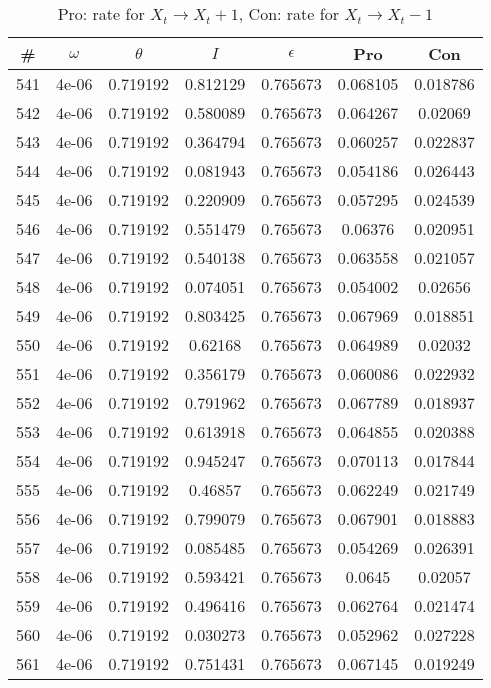 \newpage
\begin{table}
\caption{Pro: rate for $X_t \rightarrow X_t + 1$, Con: rate for $X_t \rightarrow X_t - 1$}
\begin{tabular*}{\linewidth}{c|c|c|c|c|c|c}
\# & $\omega$ & $\theta$ & $I$ & $\epsilon$ & Pro & Con \\
\hline
541 & 4e-06 & 0.719192 & 0.812129 & 0.765673 & 0.068105 & 0.018786\\
542 & 4e-06 & 0.719192 & 0.580089 & 0.765673 & 0.064267 & 0.02069\\
543 & 4e-06 & 0.719192 & 0.364794 & 0.765673 & 0.060257 & 0.022837\\
544 & 4e-06 & 0.719192 & 0.081943 & 0.765673 & 0.054186 & 0.026443\\
545 & 4e-06 & 0.719192 & 0.220909 & 0.765673 & 0.057295 & 0.024539\\
546 & 4e-06 & 0.719192 & 0.551479 & 0.765673 & 0.06376 & 0.020951\\
547 & 4e-06 & 0.719192 & 0.540138 & 0.765673 & 0.063558 & 0.021057\\
548 & 4e-06 & 0.719192 & 0.074051 & 0.765673 & 0.054002 & 0.02656\\
549 & 4e-06 & 0.719192 & 0.803425 & 0.765673 & 0.067969 & 0.018851\\
550 & 4e-06 & 0.719192 & 0.62168 & 0.765673 & 0.064989 & 0.02032\\
551 & 4e-06 & 0.719192 & 0.356179 & 0.765673 & 0.060086 & 0.022932\\
552 & 4e-06 & 0.719192 & 0.791962 & 0.765673 & 0.067789 & 0.018937\\
553 & 4e-06 & 0.719192 & 0.613918 & 0.765673 & 0.064855 & 0.020388\\
554 & 4e-06 & 0.719192 & 0.945247 & 0.765673 & 0.070113 & 0.017844\\
555 & 4e-06 & 0.719192 & 0.46857 & 0.765673 & 0.062249 & 0.021749\\
556 & 4e-06 & 0.719192 & 0.799079 & 0.765673 & 0.067901 & 0.018883\\
557 & 4e-06 & 0.719192 & 0.085485 & 0.765673 & 0.054269 & 0.026391\\
558 & 4e-06 & 0.719192 & 0.593421 & 0.765673 & 0.0645 & 0.02057\\
559 & 4e-06 & 0.719192 & 0.496416 & 0.765673 & 0.062764 & 0.021474\\
560 & 4e-06 & 0.719192 & 0.030273 & 0.765673 & 0.052962 & 0.027228\\
561 & 4e-06 & 0.719192 & 0.751431 & 0.765673 & 0.067145 & 0.019249\\

\end{tabular*}
\end{table}

